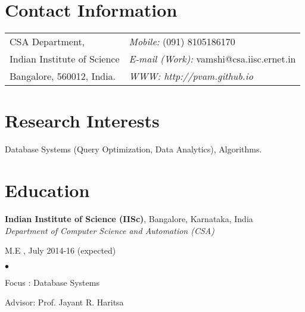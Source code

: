 \documentclass[margin,line]{res}
\newenvironment{list1}{
  \begin{list}{\ding{113}}{%
      \setlength{\itemsep}{0in}
      \setlength{\parsep}{0in} \setlength{\parskip}{0in}
      \setlength{\topsep}{0in} \setlength{\partopsep}{0in} 
      \setlength{\leftmargin}{0.17in}}}{\end{list}}
\newenvironment{list2}{
  \begin{list}{$\bullet$}{%
      \setlength{\itemsep}{0in}
      \setlength{\parsep}{0in} \setlength{\parskip}{0in}
      \setlength{\topsep}{0in} \setlength{\partopsep}{0in} 
      \setlength{\leftmargin}{0.2in}}}{\end{list}}
\begin{document}

\begin{resume}
\section{\sc Contact Information}
\vspace{.05in}
\begin{tabular}{@{}p{3in}p{4in}}
CSA Department,             & {\it Mobile:}  (091) 8105186170 \\            
Indian Institute of Science & {\it E-mail (Work):}  vamshi@csa.iisc.ernet.in\\       
Bangalore, 560012, India.  & {\it WWW: http://pvam.github.io} \\     
\end{tabular}


\section{\sc Research Interests}

Database Systems (Query Optimization, Data Analytics), Algorithms.

\section{\sc Education}
{\bf Indian Institute of Science (IISc)}, Bangalore, Karnataka, India\\
{\em Department of Computer Science and Automation (CSA)} 
\begin{list1}
\item[]  M.E , July 2014-16 (expected)
\begin{list2}
\vspace*{.05in}
%
\item Focus : Database Systems
\item Advisor:  Prof. Jayant R. Haritsa
\end{list2}
\end{list1}


\end{resume}
\end{document}
